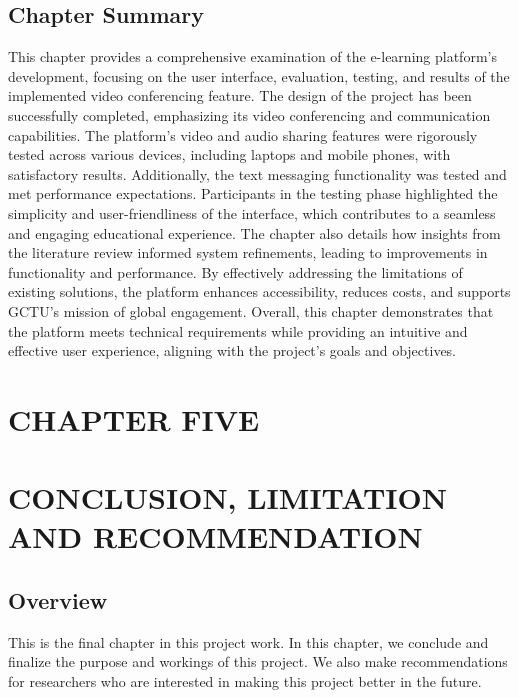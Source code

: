 \documentclass[a4paper,12pt]{article}  %
\begin{document}
\subsection{Chapter Summary}
This chapter provides a comprehensive examination of the e-learning platform's development, focusing on the user interface, evaluation, testing, and results of the implemented video conferencing feature. The design of the project has been successfully completed, emphasizing its video conferencing and communication capabilities. The platform’s video and audio sharing features were rigorously tested across various devices, including laptops and mobile phones, with satisfactory results. Additionally, the text messaging functionality was tested and met performance expectations. Participants in the testing phase highlighted the simplicity and user-friendliness of the interface, which contributes to a seamless and engaging educational experience. The chapter also details how insights from the literature review informed system refinements, leading to improvements in functionality and performance. By effectively addressing the limitations of existing solutions, the platform enhances accessibility, reduces costs, and supports GCTU’s mission of global engagement. Overall, this chapter demonstrates that the platform meets technical requirements while providing an intuitive and effective user experience, aligning with the project's goals and objectives.\\ \newpage

\begin{center}
      \section*{CHAPTER FIVE}
      \section{CONCLUSION, LIMITATION AND RECOMMENDATION}
\end{center}

\subsection{Overview}
This is the final chapter in this project work. In this chapter, we conclude and finalize the purpose and workings of this project. We also make recommendations for researchers who are interested in making this project better in the future.\\
\end{document}

